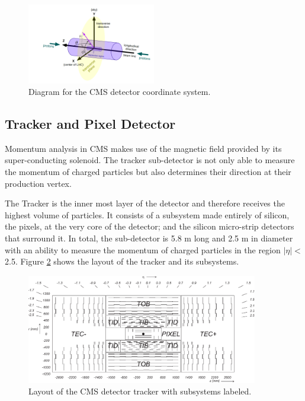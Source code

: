   \begin{figure}[H]
 	\centering
 	\includegraphics[width=0.5\textwidth]{figures/corsyslhc.png}
 	\singlespace
 	\caption{Diagram for the CMS detector coordinate system.}
 	\label{fig:cmscor}
 \end{figure}

 \subsection{Tracker and Pixel Detector}
 Momentum analysis in CMS makes use of the magnetic field provided by its super-conducting solenoid. The tracker sub-detector is not only able to measure the momentum of charged particles but also determines their direction at their production vertex.

 The Tracker is the inner most layer of the detector and therefore receives the highest volume of particles. It consists of a subsystem made entirely of silicon, the pixels, at the very core of the detector; and the silicon micro-strip detectors that surround it. In total, the sub-detector is 5.8 m long and 2.5 m in diameter with an ability to measure the momentum of charged particles in the region $|\eta|<$ 2.5. Figure \ref{fig:cmstracker} shows the layout of the tracker and its subsystems.

   \begin{figure}[H]
 	\centering
 	\includegraphics[width=0.9\textwidth]{figures/CMS_tracker.pdf}
 	\singlespace
 	\caption{Layout of the CMS detector tracker with subsystems labeled.}
 	\label{fig:cmstracker}
 \end{figure}

